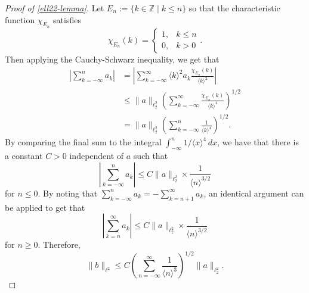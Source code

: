 \documentclass[oneside,reqno]{amsart}
\newcommand{\Z}{\mathbb{Z}}
\begin{document}
\begin{proof}[Proof of \cref{ell22-lemma}]
	Let \(E_n := \{k \in \Z \mid k \leq n\}\) so that the characteristic function \(\chi_{E_n}\) satisfies
	\begin{equation*}
		\chi_{E_n}(k) = \begin{cases}1, & k \leq n \\ 0, & k > 0\end{cases}.
	\end{equation*}
	Then applying the Cauchy-Schwarz inequality, we get that
	\begin{align*}
		\left| \sum_{k=-\infty}^n a_k \right| &= \left| \sum_{k=-\infty}^\infty \langle k\rangle ^2a_k \frac{\chi_{E_n}(k)}{\langle k \rangle^2} \right|  \\
		&\leq \| a\|_{\ell^2_2} \left( \sum_{k=-\infty}^\infty \frac{\chi_{E_n}(k)}{\langle k \rangle^4}\right)^{1/2} \\
		&= \| a\|_{\ell^2_2} \left( \sum_{k=-\infty}^n \frac{1}{\langle k \rangle^4}\right)^{1/2}.
	\end{align*}
	By comparing the final sum to the integral \(\int_{-\infty}^n 1/ \langle x\rangle^4 \, dx\), we have that there is a constant \(C>0\) independent of \(a\) such that
	\begin{equation*}
		\left| \sum_{k=-\infty}^n a_k \right|  \leq C \| a\|_{\ell^2_2} \times \frac 1 {\langle n\rangle^{3/2}}
	\end{equation*}
	for \(n\leq 0\). By noting that \(\sum_{k=-\infty}^n a_k = -\sum_{k=n+1}^\infty a_k\), an identical argument can be applied to get that 
	\begin{equation*}
		\left| \sum_{k=n}^\infty a_k \right|  \leq C \| a\|_{\ell^2_2} \times \frac 1 {\langle n\rangle ^{3/2}}
	\end{equation*}
	for \(n \geq 0\). Therefore,
	\begin{equation*}
		\|b \|_{\ell^2} \leq C \left( \sum_{n=-\infty}^\infty \frac{1}{\langle n\rangle^{3}}\right)^{1/2} \| a \|_{\ell^2_2}.
	\end{equation*}
\end{proof}


	
\end{document}
